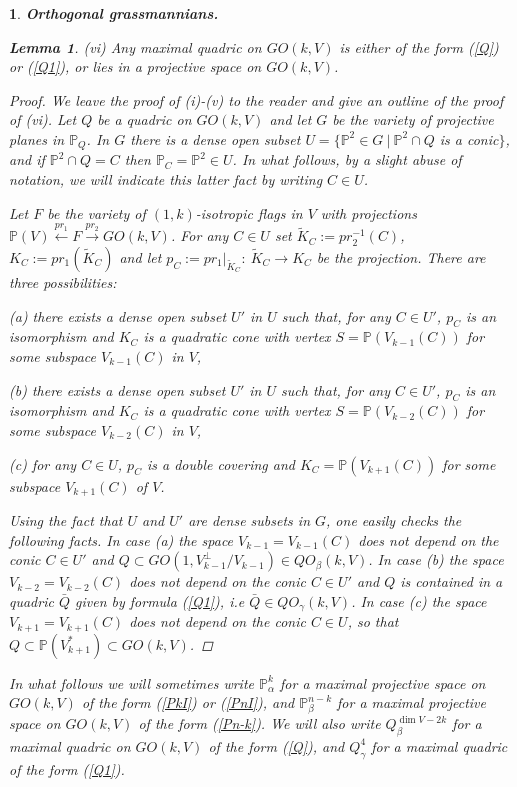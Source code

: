 \documentclass[12pt]{amsart}
\newtheorem{lemma}[theorem]{Lemma}
\newtheorem{sub}[subsection]{}
\theoremstyle{definition}
\begin{document}
\begin{sub}{\bf Orthogonal grassmannians.}
\begin{lemma}
(vi) Any maximal quadric on $GO(k,V)$ is either of the form (\ref{Q}) or (\ref{Q1}), or lies in a projective space on
$GO(k,V)$.
\end{lemma}

\begin{proof}
We leave the proof of (i)-(v) to the reader and give an outline of the proof of (vi).
Let $Q$ be a quadric on $GO(k,V)$ and let $G$ be the variety of projective planes in $\mathbb{P}_Q$.
In $G$ there is a dense open subset $U=\{\mathbb{P}^2\in G\ |\ \mathbb{P}^2\cap Q$ is a conic$\}$, and if
$\mathbb{P}^2\cap Q=C$ then $\mathbb{P}_C=\mathbb{P}^2\in U$.
In what follows, by a slight abuse of notation, we will indicate this latter fact by writing $C\in U$.


Let $F$ be the variety of $(1,k)$-isotropic flags in $V$
with projections $\mathbb{P}(V)\overset{pr_1}\leftarrow F\overset{pr_2}\to GO(k,V)$. For any $C\in U$ set
$\tilde{K}_C:=pr_2^{-1}(C)$, $K_C:=pr_1(\tilde{K}_C)$ and let $p_C:=pr_1|_{\tilde{K}_C}:\ \tilde{K}_C\to K_C$ be the
projection. There are three possibilities:

(a) there exists a dense open subset $U'$ in $U$ such that, for any $C\in U'$, $p_C$ is an isomorphism and $K_C$ is a
quadratic cone with vertex $S=\mathbb{P}(V_{k-1}(C))$ for some subspace $V_{k-1}(C)$ in $V$,

(b) there exists a dense open subset $U'$ in $U$ such that, for any $C\in U'$, $p_C$ is an isomorphism and $K_C$ is a
quadratic cone with vertex $S=\mathbb{P}(V_{k-2}(C))$ for some subspace $V_{k-2}(C)$ in $V$,

(c) for any $C\in U$, $p_C$ is a double covering and $K_C=\mathbb{P}(V_{k+1}(C))$ for some subspace $V_{k+1}(C)$ of $V$.

Using the fact that $U$ and $U'$ are dense subsets in $G$, one easily checks the following facts.
In case (a) the space $V_{k-1}=V_{k-1}(C)$ does not depend on the conic $C\in U'$ and
$Q\subset GO(1,V_{k-1}^\bot/V_{k-1})\in QO_{\beta}(k,V)$. In case (b)  the space $V_{k-2}=V_{k-2}(C)$ does not depend on
the conic $C\in U'$ and $Q$ is contained in a quadric $\bar{Q}$ given by formula (\ref{Q1}), i.e
$\bar{Q}\in QO_{\gamma}(k,V)$. In case (c) the space $V_{k+1}=V_{k+1}(C)$ does not depend on the conic $C\in U$, so that
$Q\subset\mathbb{P}(V_{k+1}^*)\subset GO(k,V)$.
\end{proof}

In what follows we will sometimes write $\mathbb{P}^k_{\alpha}$ for a maximal projective space on $GO(k,V)$ of the form
(\ref{PkI}) or (\ref{PnI}), and $\mathbb{P}^{n-k}_{\beta}$ for a maximal projective space on $GO(k,V)$ of the
form (\ref{Pn-k}). We will also write $Q^{\dim V-2k}_{\beta}$ for a maximal quadric on $GO(k,V)$ of the
form (\ref{Q}), and $Q^4_{\gamma}$ for a maximal quadric of the form (\ref{Q1}).



\end{sub}
\end{document}
